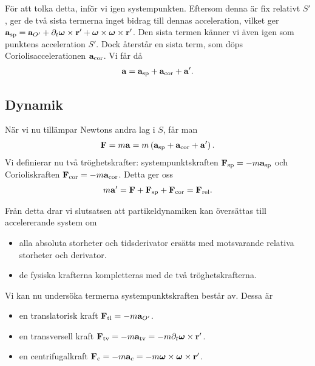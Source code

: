 För att tolka detta, inför vi igen systempunkten. Eftersom denna är fix relativt $S'$, ger de två sista termerna inget bidrag till dennas acceleration, vilket ger $\vb{a}_{\text{sp}} = \vb{a}_{O'} + \partial_{t}\vb*{\omega}\times\vb{r}' + \vb*{\omega}\times\vb*{\omega}\times\vb{r}'$. Den sista termen känner vi även igen som punktens acceleration $S'$. Dock återstår en sista term, som döps Coriolisaccelerationen $\vb{a}_{\text{cor}}$. Vi får då
\begin{align*}
	\vb{a} = \vb{a}_{\text{sp}} + \vb{a}_{\text{cor}} + \vb{a}'.
\end{align*}

\subsection{Dynamik}

När vi nu tillämpar Newtons andra lag i $S$, får man
\begin{align*}
	\vb{F} = m\vb{a} = m\left(\vb{a}_{\text{sp}} + \vb{a}_{\text{cor}} + \vb{a}'\right).
\end{align*}
Vi definierar nu två tröghetskrafter: systempunktskraften $\vb{F}_{\text{sp}} = - m\vb{a}_{\text{sp}}$ och Corioliskraften $\vb{F}_{\text{cor}} = - m\vb{a}_{\text{cor}}$. Detta ger oss
\begin{align*}
	m\vb{a}' = \vb{F} + \vb{F}_{\text{sp}} + \vb{F}_{\text{cor}} = \vb{F}_{\text{rel}}.
\end{align*}

Från detta drar vi slutsatsen att partikeldynamiken kan översättas till accelererande system om
\begin{itemize}
	\item alla absoluta storheter och tidsderivator ersätts med motsvarande relativa storheter och derivator.
	\item de fysiska krafterna kompletteras med de två tröghetskrafterna.
\end{itemize}

Vi kan nu undersöka termerna systempunktskraften består av. Dessa är
\begin{itemize}
	\item en translatorisk kraft $\vb{F}_{\text{tl}} = -m\vb{a}_{O'}$.
	\item en transversell kraft $\vb{F}_{\text{tv}} = -m\vb{a}_{\text{tv}} = -m\partial_{t}\vb*{\omega}\times\vb{r}'$.
	\item en centrifugalkraft $\vb{F}_{\text{c}} = -m\vb{a}_{\text{c}} = -m\vb*{\omega}\times\vb*{\omega}\times\vb{r}'$.
\end{itemize}